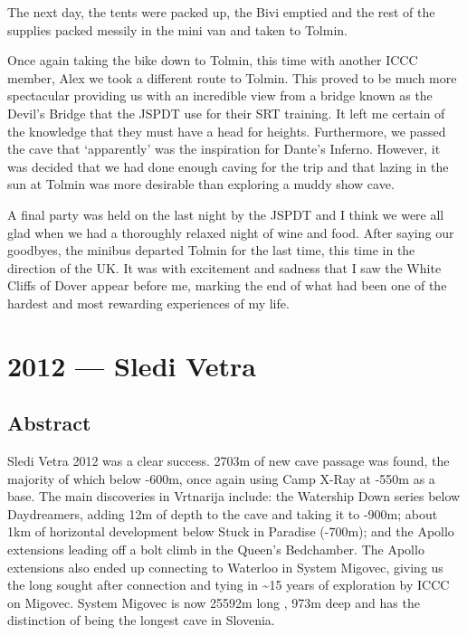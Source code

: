 The next day, the tents were packed up, the Bivi emptied and the rest of
the supplies packed messily in the mini van and taken to Tolmin.

Once again taking the bike down to Tolmin, this time with another ICCC
member, Alex we took a different route to Tolmin. This proved to be much
more spectacular providing us with an incredible view from a bridge
known as the Devil's Bridge that the JSPDT use for their SRT training.
It left me certain of the knowledge that they must have a head for
heights. Furthermore, we passed the cave that `apparently' was the
inspiration for Dante's Inferno. However, it was decided that we had
done enough caving for the trip and that lazing in the sun at Tolmin was
more desirable than exploring a muddy show cave.

A final party was held on the last night by the JSPDT and I think we
were all glad when we had a thoroughly relaxed night of wine and food.
After saying our goodbyes, the minibus departed Tolmin for the last
time, this time in the direction of the UK. It was with excitement and
sadness that I saw the White Cliffs of Dover appear before me, marking
the end of what had been one of the hardest and most rewarding
experiences of my life.

\hypertarget{sledi-vetra}{%
\chapter{2012 --- Sledi Vetra}\label{sledi-vetra}}

\hypertarget{abstract}{%
\section{Abstract}\label{abstract}}

Sledi Vetra 2012 was a clear success. 2703m of new cave passage was
found, the majority of which below -600m, once again using Camp X-Ray at
-550m as a base. The main discoveries in Vrtnarija include: the
Watership Down series below Daydreamers, adding 12m of depth to the cave
and taking it to -900m; about 1km of horizontal development below Stuck
in Paradise (-700m); and the Apollo extensions leading off a bolt climb
in the Queen's Bedchamber. The Apollo extensions also ended up
connecting to Waterloo in System Migovec, giving us the long sought
after connection and tying in \textasciitilde{}15 years of exploration
by ICCC on Migovec. System Migovec is now 25592m long , 973m deep and
has the distinction of being the longest cave in Slovenia.

